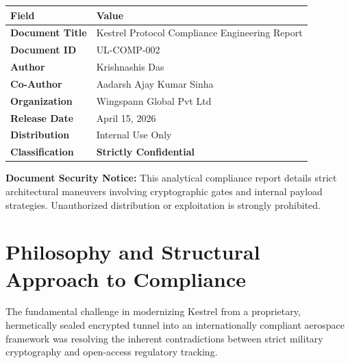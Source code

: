 \documentclass[11pt,a4paper]{article}
\begin{document}
\begin{table}[H]
	\renewcommand{\arraystretch}{1.5}
	\begin{tabularx}{\textwidth}{@{}lX@{}}
		\toprule
		\textbf{Field} & \textbf{Value} \\
		\midrule
		\textbf{Document Title} & Kestrel Protocol Compliance Engineering Report \\
		\textbf{Document ID} & UL-COMP-002 \\
		\midrule
		\textbf{Author} & Krishnashis Das \\
		\textbf{Co-Author} & Aadarsh Ajay Kumar Sinha \\
		\textbf{Organization} & Wingspann Global Pvt Ltd \\
		\midrule
		\textbf{Release Date} & April 15, 2026 \\
		\midrule
		\textbf{Distribution} & Internal Use Only \\
		\textbf{Classification} & \textcolor{alertred}{\textbf{Strictly Confidential}} \\
		\bottomrule
	\end{tabularx}
\end{table}

\vspace{1cm}

\begin{alertbox}
	\textbf{Document Security Notice:} This analytical compliance report details strict architectural maneuvers involving cryptographic gates and internal payload strategies. Unauthorized distribution or exploitation is strongly prohibited.
\end{alertbox}

\newpage
\tableofcontents
\newpage

\section{Philosophy and Structural Approach to Compliance}

The fundamental challenge in modernizing Kestrel from a proprietary, hermetically sealed encrypted tunnel into an internationally compliant aerospace framework was resolving the inherent contradictions between strict military cryptography and open-access regulatory tracking.
\end{document}
